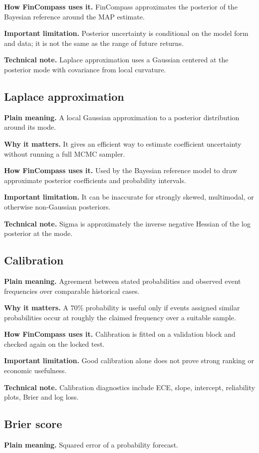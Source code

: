 \documentclass[11pt]{article}
\begin{document}
\textbf{How FinCompass uses it.} FinCompass approximates the posterior of the Bayesian reference around the MAP estimate.

\textbf{Important limitation.} Posterior uncertainty is conditional on the model form and data; it is not the same as the range of future returns.

\textbf{Technical note.} Laplace approximation uses a Gaussian centered at the posterior mode with covariance from local curvature.

\subsection{Laplace approximation}
\textbf{Plain meaning.} A local Gaussian approximation to a posterior distribution around its mode.

\textbf{Why it matters.} It gives an efficient way to estimate coefficient uncertainty without running a full MCMC sampler.

\textbf{How FinCompass uses it.} Used by the Bayesian reference model to draw approximate posterior coefficients and probability intervals.

\textbf{Important limitation.} It can be inaccurate for strongly skewed, multimodal, or otherwise non-Gaussian posteriors.

\textbf{Technical note.} Sigma is approximately the inverse negative Hessian of the log posterior at the mode.

\subsection{Calibration}
\textbf{Plain meaning.} Agreement between stated probabilities and observed event frequencies over comparable historical cases.

\textbf{Why it matters.} A 70\% probability is useful only if events assigned similar probabilities occur at roughly the claimed frequency over a suitable sample.

\textbf{How FinCompass uses it.} Calibration is fitted on a validation block and checked again on the locked test.

\textbf{Important limitation.} Good calibration alone does not prove strong ranking or economic usefulness.

\textbf{Technical note.} Calibration diagnostics include ECE, slope, intercept, reliability plots, Brier and log loss.

\subsection{Brier score}
\textbf{Plain meaning.} Squared error of a probability forecast.
\end{document}
